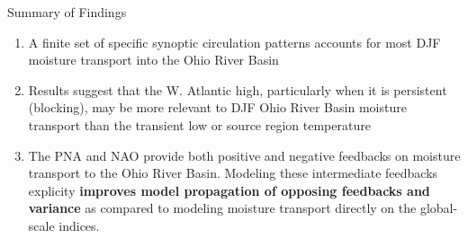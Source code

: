 \begin{block}{Summary of Findings}
    \begin{enumerate}
        \item A finite set of specific synoptic circulation patterns accounts for most DJF moisture transport into the Ohio River Basin
        \item Results suggest that the W. Atlantic high, particularly when it is persistent (blocking), may be more relevant to DJF Ohio River Basin moisture transport than the transient low or source region temperature
        \item The PNA and NAO provide both positive and negative feedbacks on moisture transport to the Ohio River Basin. Modeling these intermediate feedbacks explicity \textbf{improves model propagation of opposing feedbacks and variance} as compared to modeling moisture transport directly on the global-scale indices.
    \end{enumerate}
\end{block}
